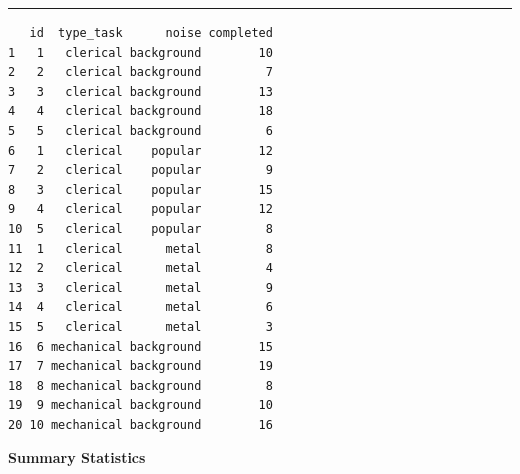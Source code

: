 \documentclass[]{article}
\begin{document}
\begin{center}\rule{0.5\linewidth}{\linethickness}\end{center}

\begin{verbatim}
   id  type_task      noise completed
1   1   clerical background        10
2   2   clerical background         7
3   3   clerical background        13
4   4   clerical background        18
5   5   clerical background         6
6   1   clerical    popular        12
7   2   clerical    popular         9
8   3   clerical    popular        15
9   4   clerical    popular        12
10  5   clerical    popular         8
11  1   clerical      metal         8
12  2   clerical      metal         4
13  3   clerical      metal         9
14  4   clerical      metal         6
15  5   clerical      metal         3
16  6 mechanical background        15
17  7 mechanical background        19
18  8 mechanical background         8
19  9 mechanical background        10
20 10 mechanical background        16
\end{verbatim}

\clearpage

\textbf{Summary Statistics}
\end{document}
